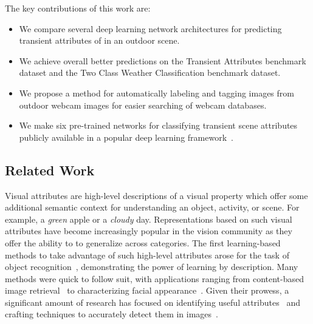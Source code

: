 \documentclass{article}
\begin{document}
The key contributions of this work are:
\begin{itemize}

  \item We compare several deep learning network architectures for
    		predicting transient attributes of in an outdoor scene.

	\item We achieve overall better predictions on the Transient Attributes
				benchmark dataset and the Two Class Weather Classification 
				benchmark dataset.

	\item We propose a method for automatically labeling and tagging images
				from outdoor webcam images for easier searching of webcam databases.

      \item We make six pre-trained networks for classifying transient
        scene attributes publicly available in a popular deep learning
        framework~\cite{caffe14}.



\end{itemize}

\subsection{Related Work}

Visual attributes are high-level descriptions of a visual property
which offer some additional semantic context for understanding an
object, activity, or scene. For example, a \emph{green} apple or a
\emph{cloudy} day. Representations based on such visual attributes
have become increasingly popular in the vision community as they offer
the ability to to generalize across categories. The first
learning-based methods to take advantage of such high-level attributes
arose for the task of object
recognition~\cite{farhadi2009describing,lampert2009learning},
demonstrating the power of learning by description. Many methods were
quick to follow suit, with applications ranging from content-based
image retrieval~\cite{siddiquie2011image} to characterizing facial
appearance~\cite{kumar2011describable}. Given their prowess, a
significant amount of research has focused on identifying useful
attributes~\cite{berg2010automatic} and crafting techniques to
accurately detect them in images~\cite{vedaldi2014understanding}. 
\end{document}
